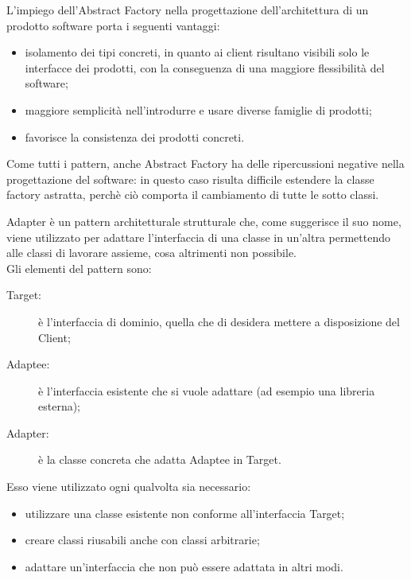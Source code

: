 L'impiego dell'Abstract Factory nella progettazione dell'architettura di un prodotto software porta i seguenti vantaggi:
\begin{itemize}
\item isolamento dei tipi concreti, in quanto ai client risultano visibili solo le interfacce dei prodotti, con la conseguenza di una maggiore flessibilità del software;
\item maggiore semplicità nell'introdurre e usare diverse famiglie di prodotti;
\item favorisce la consistenza dei prodotti concreti.
\end{itemize}
Come tutti i pattern, anche Abstract Factory ha delle ripercussioni negative nella progettazione del software: in questo caso risulta difficile estendere la classe factory astratta, perchè ciò comporta il cambiamento di tutte le sotto classi.

 \label{app:adapter}
Adapter è un pattern architetturale strutturale che, come suggerisce il suo nome, viene utilizzato per adattare l'interfaccia di una classe in un'altra permettendo alle classi di lavorare assieme, cosa altrimenti non possibile.\\
Gli elementi del pattern sono:
\begin{description}
\item[Target:] è l'interfaccia di dominio, quella che di desidera mettere a disposizione del Client;
\item[Adaptee:] è l'interfaccia esistente che si vuole adattare (ad esempio una libreria esterna);
\item[Adapter:] è la classe concreta che adatta Adaptee in Target.
\end{description}

Esso viene utilizzato ogni qualvolta sia necessario:
\begin{itemize}
\item utilizzare una classe esistente non conforme all'interfaccia Target;
\item creare classi riusabili anche con classi arbitrarie;
\item adattare un'interfaccia che non può essere adattata in altri modi.
\end{itemize}

